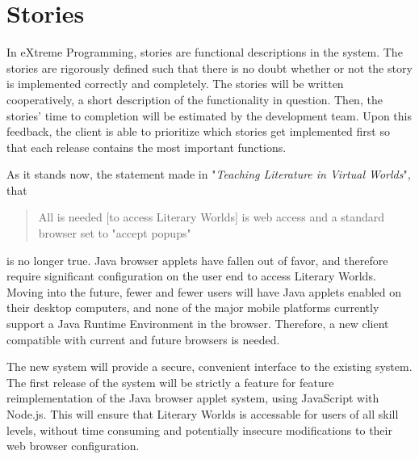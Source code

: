 \documentclass[12pt, letterpaper]{report}
\begin{document}
%
\chapter{Stories}
\par
In eXtreme Programming, stories are functional descriptions in the system. The stories are rigorously defined such that there is no doubt whether or not the story is implemented correctly and completely. The stories will be written cooperatively, a short description of the functionality in question. Then, the stories' time to completion will be estimated by the development team. Upon this feedback, the client is able to prioritize which stories get implemented first so that each release contains the most important functions.

\par
As it stands now, the statement made in "\textit{Teaching Literature in Virtual Worlds}", that 

\begin{quotation}
All is needed [to access Literary Worlds] is web access and a standard browser set to "accept popups" \cite[9]{Webb}
\end{quotation}
is no longer true. Java browser applets have fallen out of favor, and therefore require significant configuration on the user end to access Literary Worlds. Moving into the future, fewer and fewer users will have Java applets enabled on their desktop computers, and none of the major mobile platforms currently support a Java Runtime Environment in the browser. Therefore, a new client compatible with current and future browsers is needed.

\par
The new system will provide a secure, convenient interface to the existing system. The first release of the system will be strictly a feature for feature reimplementation of the Java browser applet system, using JavaScript with Node.js. This will ensure that Literary Worlds is accessable for users of all skill levels, without time consuming and potentially insecure modifications to their web browser configuration.
\end{document}
